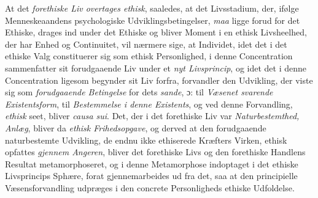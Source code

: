 At det \emph{forethiske Liv overtages ethisk}, saaledes, at det Livsstadium, der,
ifølge Menneskeaandens psychologiske Udviklingsbetingelser, \emph{maa} ligge
forud for det Ethiske, drages ind under det Ethiske og bliver Moment i en ethisk
Livsheelhed, der har Enhed og Continuitet, vil nærmere sige, at Individet, idet
det i det ethiske Valg constituerer sig som ethisk Personlighed, i denne
Concentration sammenfatter sit forudgaaende Liv under et \emph{nyt Livsprincip},
og idet det i denne Concentration ligesom begynder sit Liv forfra, forvandler den
Udvikling, der viste sig som \emph{forudgaaende Betingelse} for dets \emph{sande},
ɔ: til \emph{Væsenet svarende}
 \emph{Existentsform}, til \emph{Bestemmelse i denne Existents}, og ved denne
Forvandling, \emph{ethisk} seet, bliver \emph{\textit{causa sui}}. Det, der i det
forethiske Liv var \emph{Naturbestemthed, Anlæg}, bliver da \emph{ethisk
Frihedsopgave}, og derved at den forudgaaende naturbestemte Udvikling, de endnu
ikke ethiserede Kræfters Virken, ethisk opfattes \emph{gjennem Angeren}, bliver
det forethiske Livs og den forethiske Handlens Resultat metamorphoseret, og i
denne Metamorphose indoptaget i det ethiske Livsprincips Sphære, forat
gjennemarbeides ud fra det, saa at den principielle Væsensforvandling udpræges i
den concrete Personligheds ethiske Udfoldelse.

